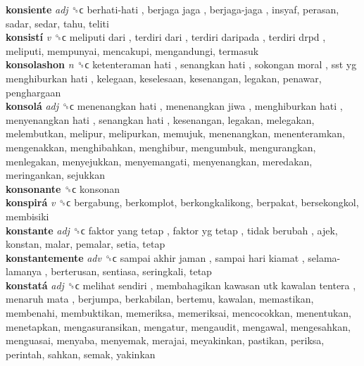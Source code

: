 \textbf{konsiente} \emph{adj}  ␝ϲ   berhati-hati ,  berjaga jaga ,  berjaga-jaga , insyaf, perasan, sadar, sedar, tahu, teliti  \\
\textbf{konsistí} \emph{v}  ␝ϲ   meliputi dari ,  terdiri dari ,  terdiri daripada ,  terdiri drpd , meliputi, mempunyai, mencakupi, mengandungi, termasuk  \\
\textbf{konsolashon} \emph{n}  ␝ϲ   ketenteraman hati ,  senangkan hati ,  sokongan moral ,  sst yg menghiburkan hati , kelegaan, keselesaan, kesenangan, legakan, penawar, penghargaan  \\
\textbf{konsolá} \emph{adj}  ␝ϲ   menenangkan hati ,  menenangkan jiwa ,  menghiburkan hati ,  menyenangkan hati ,  senangkan hati , kesenangan, legakan, melegakan, melembutkan, melipur, melipurkan, memujuk, menenangkan, menenteramkan, mengenakkan, menghibahkan, menghibur, mengumbuk, mengurangkan, menlegakan, menyejukkan, menyemangati, menyenangkan, meredakan, meringankan, sejukkan  \\
\textbf{konsonante} ␝ϲ  konsonan  \\
\textbf{konspirá} \emph{v}  ␝ϲ  bergabung, berkomplot, berkongkalikong, berpakat, bersekongkol, membisiki  \\
\textbf{konstante} \emph{adj}  ␝ϲ   faktor yang tetap ,  faktor yg tetap ,  tidak berubah , ajek, konstan, malar, pemalar, setia, tetap  \\
\textbf{konstantemente} \emph{adv}  ␝ϲ   sampai akhir jaman ,  sampai hari kiamat ,  selama-lamanya , berterusan, sentiasa, seringkali, tetap  \\
\textbf{konstatá} \emph{adj}  ␝ϲ   melihat sendiri ,  membahagikan kawasan utk kawalan tentera ,  menaruh mata , berjumpa, berkabilan, bertemu, kawalan, memastikan, membenahi, membuktikan, memeriksa, memeriksai, mencocokkan, menentukan, menetapkan, mengasuransikan, mengatur, mengaudit, mengawal, mengesahkan, menguasai, menyaba, menyemak, merajai, meyakinkan, pastikan, periksa, perintah, sahkan, semak, yakinkan  \\
